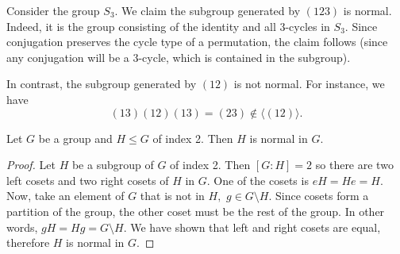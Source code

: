 \begin{example}
  Consider the group $S_3$. We claim the subgroup generated by $(1 2 3)$ is normal.
  Indeed, it is the group consisting of the identity and all 3-cycles in $S_3$. Since
  conjugation preserves the cycle type of a permutation, the claim follows (since any
  conjugation will be a 3-cycle, which is contained in the subgroup).

    In contrast, the subgroup generated by $(12)$ is not normal. For instance, we have
  \[(13)(12)(13)=(23)\not\in \langle(12)\rangle. \]

\end{example}

\begin{theorem}
    Let $G$ be a group and $H \leq G$ of index 2. Then $H$ is normal in $G$.
    \label{thm:index2}
\end{theorem}
\begin{proof}
    Let $H$ be a subgroup of $G$ of index 2. Then $[G:H] = 2$ so there are two left cosets and two right cosets of $H$ in $G.$ One of the cosets is $eH=He=H.$ Now, take an element of $G$ that is not in $H,$ $g\in G\setminus H.$ Since cosets form a partition of the group, the other coset must be the rest of the group. In other words, $gH=Hg=G\setminus H.$ We have shown that left and right cosets are equal, therefore $H$ is normal in $G.$ 




    
    
\end{proof}

